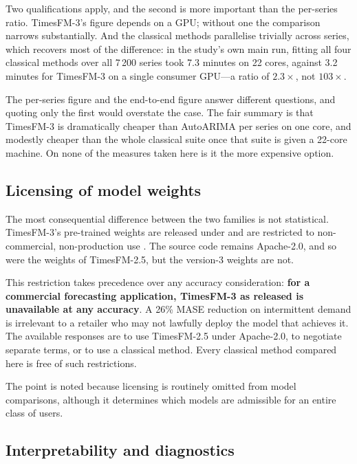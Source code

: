 \documentclass[article]{ajs}
\begin{document}
Two qualifications apply, and the second is more important than the per-series ratio.
TimesFM-3's figure depends on a GPU; without one the comparison narrows substantially. And the
classical methods parallelise trivially across series, which recovers most of the difference: in
the study's own main run, fitting all four classical methods over all 7\,200 series took 7.3
minutes on 22 cores, against 3.2 minutes for TimesFM-3 on a single consumer GPU---a ratio of
$2.3\times$, not $103\times$.

The per-series figure and the end-to-end figure answer different questions, and quoting only the
first would overstate the case. The fair summary is that TimesFM-3 is dramatically cheaper than
AutoARIMA per series on one core, and modestly cheaper than the whole classical suite once that
suite is given a 22-core machine. On none of the measures taken here is it the more expensive
option.

\subsection{Licensing of model weights}
\label{sec:licence}

The most consequential difference between the two families is not statistical. TimesFM-3's
pre-trained weights are released under  and are
restricted to non-commercial, non-production use \citep{timesfm3repo}. The source code remains
Apache-2.0, and so were the weights of TimesFM-2.5, but the version-3 weights are not.

This restriction takes precedence over any accuracy consideration: \textbf{for a
commercial forecasting application, TimesFM-3 as released is unavailable at any accuracy}. A
26\% MASE reduction on intermittent demand is irrelevant to a retailer who may not lawfully
deploy the model that achieves it. The available responses are to use TimesFM-2.5 under
Apache-2.0, to negotiate separate terms, or to use a classical method. Every classical method
compared here is free of such restrictions.

The point is noted because licensing is routinely omitted from model comparisons, although it
determines which models are admissible for an entire class of users.

\subsection{Interpretability and diagnostics}
\label{sec:interpret}
\end{document}
